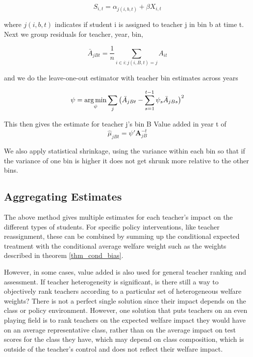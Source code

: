 \documentclass[12pt]{article}
\theoremstyle{definition}
\theoremstyle{definition}
\theoremstyle{definition}
\theoremstyle{definition}
\begin{document}
     \begin{equation}
        S_{i,t} = \alpha_{j(i,b, t)} + \beta X_{i, t}
    \end{equation}

    where $j(i,b, t)$ indicates if student i is assigned to teacher j in bin b at time t. Next we group residuals for teacher, year, bin, 

    \begin{equation}
        \bar{A}_{jBt} = \frac{1}{n} \sum_{i \in {i: j(i, B, t) = j}} A_{it}
    \end{equation}

    and we do the leave-one-out estimator with teacher bin estimates across years 

    \begin{equation}
        \psi = \operatorname*{arg\,min}_{\psi} \sum_j \big(  \bar{A}_{jBt} - \sum_{s = 1}^{t-1} \psi_s \bar{A}_{jBs} \big)^2
    \end{equation}

    This then gives the estimate for teacher j's  bin B Value added in year t of 
    \begin{equation}
        \hat{\mu}_{jBt} = \psi'\mathbf{A}_{jB}^{-t}
    \end{equation}

    We also apply statistical shrinkage, using the variance within each bin so that if the variance of one bin is higher it does not get shrunk more relative to the other bins. 



        \subsection{Aggregating Estimates}
        The above method gives multiple estimates for each teacher's impact on the different types of students. For specific policy interventions, like teacher reassignment, these can be combined by summing up the conditional expected treatment with the conditional average welfare weight such as the weights described in theorem \ref{thm_cond_bias}. 

        However, in some cases,  value added is also used for general teacher ranking and assessment. If teacher heterogeneity is significant, is there still a way to objectively rank teachers according to a particular set of heterogeneous welfare weights? There is not a perfect single solution since their impact depends on the class or policy environment. However, one solution that puts teachers on an even playing field is to rank teachers on the expected welfare impact they would have on an average representative class, rather than on the average impact on test scores for the class they have, which may depend on class composition, which is outside of the teacher's control and does not reflect their welfare impact.
        
\end{document}
